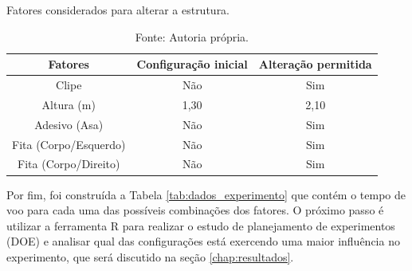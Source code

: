 \begin{table}[H]
  \caption{Fatores considerados para alterar a estrutura.}
  \centering
  \begin{tabular}{|c|c|c|}
  \hline
  \rowcolor[HTML]{EFEFEF} 
  \textbf{Fatores}      & \textbf{Configuração inicial} & \textbf{Alteração permitida} \\ \hline
  Clipe                 & Não                         & Sim                          \\ \hline
  \rowcolor[HTML]{EFEFEF} 
  Altura (m)            & 1,30                        & 2,10                         \\ \hline
  Adesivo (Asa)         & Não                         & Sim                          \\ \hline
  \rowcolor[HTML]{EFEFEF} 
  Fita (Corpo/Esquerdo) & Não                         & Sim                          \\ \hline
  Fita (Corpo/Direito)  & Não                         & Sim                          \\ \hline
  \end{tabular}
  \caption*{Fonte: Autoria própria.}
  \label{tab:fatores}
  \end{table}

Por fim, foi construída a Tabela \ref{tab:dados_experimento} que contém o tempo de voo para cada uma das possíveis combinações dos fatores. O próximo passo é utilizar a ferramenta R para realizar o estudo de planejamento de experimentos (DOE) e analisar qual das configurações está exercendo uma maior influência no experimento, que será discutido na seção \ref{chap:resultados}.


